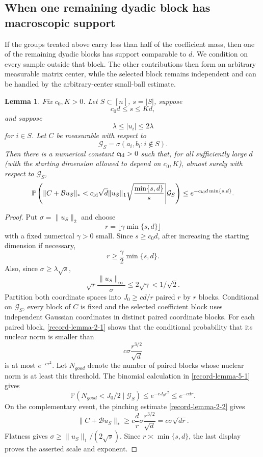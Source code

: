 \documentclass[11pt]{article}
\numberwithin{equation}{section}
\newtheorem{lemma}[theorem]{Lemma}
\theoremstyle{definition}
\theoremstyle{remark}
\newcommand{\Pp}{\mathbb P}
\newcommand{\1}{\boldsymbol 1}
\begin{document}
\begin{aiblock}
\subsection{When one remaining dyadic block has
  macroscopic support}\label{macroscopic-late-driver}

If the groups treated above carry less than half of the
coefficient mass, then one of the remaining dyadic blocks
has support comparable to $d$. We condition on every
sample outside that block. The other contributions then
form an arbitrary measurable matrix center, while the
selected block remains independent and can be handled by
the arbitrary-center small-ball estimate.

\begin{lemma}\label{record-lemma-9-1}
  Fix $c_0,K>0$. Let $S\subset[n]$, $s=|S|$, suppose
  \[
    c_0d\le s\le Kd,
  \]
  and suppose
  \[
    \lambda\le|u_i|\le2\lambda
  \]
  for $i\in S$. Let $C$ be measurable with respect to
  \[
    \mathcal{G}_S=\sigma(a_i,b_i:i\notin S).
  \]
  Then there is a numerical constant $c_{\rm ld}>0$ such
  that, for all sufficiently large $d$ (with the starting
  dimension allowed to depend on $c_0,K$), almost surely
  with respect to $\mathcal{G}_S$,
  \[
    \Pp\left(\|C+\mathcal{B}u_S\|_*<c_{\rm ld}\sqrt d
    \|u_S\|_1\sqrt{\frac{\min\{s,d\}}s}\middle|
    \mathcal{G}_S\right) \le e^{-c_{\rm ld}d\min\{s,d\}}.
  \]
\end{lemma}

\begin{proof}
  Put $\sigma=\|u_S\|_2$ and choose
  \[
    r=\lfloor\gamma\min\{s,d\}\rfloor
  \]
  with a fixed numerical $\gamma>0$ small. Since
  $s\ge c_0d$, after increasing the starting dimension
  if necessary,
  \[
    r\ge\frac\gamma2\min\{s,d\}.
  \]
  Also, since $\sigma\ge\lambda\sqrt s$,
  \[
    \sqrt r\frac{\|u_S\|_\infty}{\sigma} \le
    2\sqrt\gamma<1/\sqrt2.
  \]
  Partition both coordinate spaces into $J_0\ge cd/r$
  paired $r$ by $r$ blocks. Conditional on
  $\mathcal{G}_S$, every block of $C$ is fixed and the
  selected coefficient block uses independent Gaussian
  coordinates in distinct paired coordinate blocks. For
  each paired block, \cref{record-lemma-2-1} shows that
  the conditional probability that its nuclear norm is
  smaller than
  \[
    c\sigma\frac{r^{3/2}}{\sqrt d}
  \]
  is at most $e^{-cr^2}$. Let $N_{good}$ denote the
  number of paired blocks whose nuclear norm is at least
  this threshold. The binomial calculation in
  \cref{record-lemma-5-1} gives
  \[
    \Pp(N_{good}<J_0/2\mid\mathcal{G}_S)\le
    e^{-cJ_0r^2}\le e^{-cdr}.
  \]
  On the complementary event, the pinching estimate
  \cref{record-lemma-2-2} gives
  \[
    \|C+\mathcal{B}u_S\|_* \ge c\frac dr\sigma
    \frac{r^{3/2}}{\sqrt d} = c\sigma\sqrt{dr}.
  \]
  Flatness gives $\sigma\ge\|u_S\|_1/(2\sqrt s)$. Since
  $r\asymp\min\{s,d\}$, the last display proves the
  asserted scale and exponent.
\end{proof}


\end{aiblock}
\end{document}
